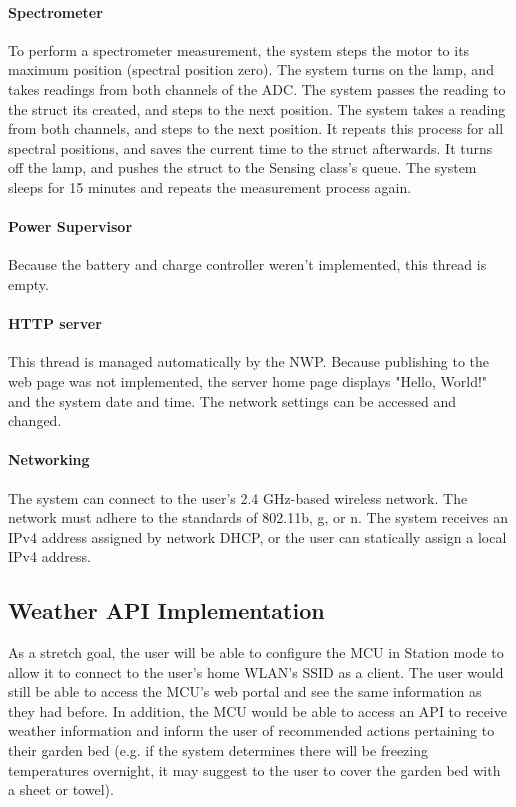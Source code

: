\paragraph{Spectrometer} To perform a spectrometer measurement, the system steps the motor to its maximum position (spectral position zero). The system turns on the lamp, and takes readings from both channels of the ADC. The system passes the reading to the struct its created, and steps to the next position. The system takes a reading from both channels, and steps to the next position. It repeats this process for all spectral positions, and saves the current time to the struct afterwards. It turns off the lamp, and pushes the struct to the Sensing class's queue. The system sleeps for 15 minutes and repeats the measurement process again.

\paragraph{Power Supervisor} Because the battery and charge controller weren't implemented, this thread is empty.

\paragraph{HTTP server} This thread is managed automatically by the NWP. Because publishing to the web page was not implemented, the server home page displays "Hello, World!" and the system date and time. The network settings can be accessed and changed.

\paragraph{Networking} The system can connect to the user's 2.4 GHz-based wireless network. The network must adhere to the standards of 802.11b, g, or n. The system receives an IPv4 address assigned by network DHCP, or the user can statically assign a local IPv4 address.

\subsection{Weather API Implementation}
As a stretch goal, the user will be able to configure the MCU in Station mode to allow it to connect to the user's home WLAN's SSID as a client. The user would still be able to access the MCU's web portal and see the same information as they had before. In addition, the MCU would be able to access an API to receive weather information and inform the user of recommended actions pertaining to their garden bed (e.g. if the system determines there will be freezing temperatures overnight, it may suggest to the user to cover the garden bed with a sheet or towel).

